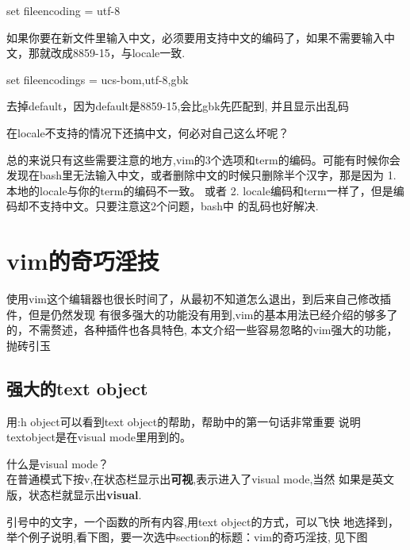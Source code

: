 \documentclass[adobefonts]{ctexart}
\begin{document}
set fileencoding = utf-8

如果你要在新文件里输入中文，必须要用支持中文的编码了，如果不需要输入中文，那就改成8859-15，与locale一致.

set fileencodings = ucs-bom,utf-8,gbk

去掉default，因为default是8859-15,会比gbk先匹配到, 并且显示出乱码

在locale不支持的情况下还搞中文，何必对自己这么坏呢？

总的来说只有这些需要注意的地方,vim的3个选项和term的编码。可能有时候你会发现在bash里无法输入中文，或者删除中文的时候只删除半个汉字，那是因为
1.本地的locale与你的term的编码不一致。 或者 2. locale编码和term一样了，但是编码却不支持中文。只要注意这2个问题，bash中
的乱码也好解决.

\section{vim的奇巧淫技}
使用vim这个编辑器也很长时间了，从最初不知道怎么退出，到后来自己修改插件，但是仍然发现
有很多强大的功能没有用到,vim的基本用法已经介绍的够多了的，不需赘述，各种插件也各具特色,
本文介绍一些容易忽略的vim强大的功能，抛砖引玉
\subsection{强大的text object}
用:h object可以看到text object的帮助，帮助中的第一句话非常重要
说明textobject是在visual mode里用到的。

什么是visual mode？\\
在普通模式下按v,在状态栏显示出\textbf{可视},表示进入了visual mode,当然
如果是英文版，状态栏就显示出\textbf{visual}.

引号中的文字，一个函数的所有内容,用text object的方式，可以飞快
地选择到，举个例子说明,看下图，要一次选中section的标题：vim的奇巧淫技,
见下图
\end{document}
